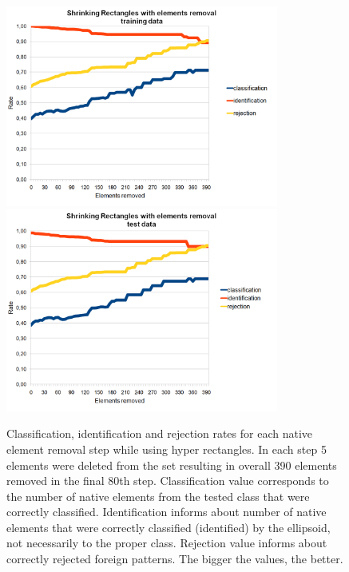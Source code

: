 \begin{figure}[htp]
	\centering
	\includegraphics[width=0.80\textwidth]{Figures/charts/DIGITS/DIGITS_ShrinkingRectanglesElementsRemovalTraining.png}
	\hspace{12pt}
	\includegraphics[width=0.80\textwidth]{Figures/charts/DIGITS/DIGITS_ShrinkingRectanglesElementsRemovalTest.png}
	\caption{ Classification, identification and rejection rates for each native element removal step while using hyper rectangles. In each step 5 elements were deleted from the set resulting in overall 390 elements removed in the final 80th step. Classification value corresponds to the number of native elements from the tested class that were correctly classified. Identification informs about number of native elements that were correctly classified (identified) by the ellipsoid, not necessarily to the proper class. Rejection value informs about correctly rejected foreign patterns. The bigger the values, the better. }
	\label{fig:shrinking_rectangles_elements_rejection}\vspace{-3pt}
\end{figure}


